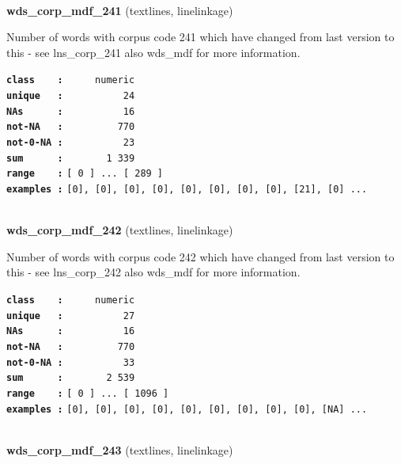 \documentclass[]{article}
\begin{document}
~

\textbf{wds\_corp\_mdf\_241} (textlines, linelinkage)

Number of words with corpus code 241 which have changed from last
version to this - see lns\_corp\_241 also wds\_mdf for more information.

\textbf{\texttt{class\ \ \ \ :}} \texttt{~~~~~numeric}\\
\textbf{\texttt{unique\ \ \ :}} \texttt{~~~~~~~~~~24}\\
\textbf{\texttt{NAs\ \ \ \ \ \ :}} \texttt{~~~~~~~~~~16}\\
\textbf{\texttt{not-NA\ \ \ :}} \texttt{~~~~~~~~~770}\\
\textbf{\texttt{not-0-NA\ :}} \texttt{~~~~~~~~~~23}\\
\textbf{\texttt{sum\ \ \ \ \ \ :}} \texttt{~~~~~~~1~339}\\
\textbf{\texttt{range\ \ \ \ :}}
\texttt{{[}\ 0\ {]}\ ...\ {[}\ 289\ {]}}\\
\textbf{\texttt{examples\ :}}
\texttt{{[}0{]},\ {[}0{]},\ {[}0{]},\ {[}0{]},\ {[}0{]},\ {[}0{]},\ {[}0{]},\ {[}0{]},\ {[}21{]},\ {[}0{]}\ ...}\\

~

\textbf{wds\_corp\_mdf\_242} (textlines, linelinkage)

Number of words with corpus code 242 which have changed from last
version to this - see lns\_corp\_242 also wds\_mdf for more information.

\textbf{\texttt{class\ \ \ \ :}} \texttt{~~~~~numeric}\\
\textbf{\texttt{unique\ \ \ :}} \texttt{~~~~~~~~~~27}\\
\textbf{\texttt{NAs\ \ \ \ \ \ :}} \texttt{~~~~~~~~~~16}\\
\textbf{\texttt{not-NA\ \ \ :}} \texttt{~~~~~~~~~770}\\
\textbf{\texttt{not-0-NA\ :}} \texttt{~~~~~~~~~~33}\\
\textbf{\texttt{sum\ \ \ \ \ \ :}} \texttt{~~~~~~~2~539}\\
\textbf{\texttt{range\ \ \ \ :}}
\texttt{{[}\ 0\ {]}\ ...\ {[}\ 1096\ {]}}\\
\textbf{\texttt{examples\ :}}
\texttt{{[}0{]},\ {[}0{]},\ {[}0{]},\ {[}0{]},\ {[}0{]},\ {[}0{]},\ {[}0{]},\ {[}0{]},\ {[}0{]},\ {[}NA{]}\ ...}\\

~

\textbf{wds\_corp\_mdf\_243} (textlines, linelinkage)
\end{document}
